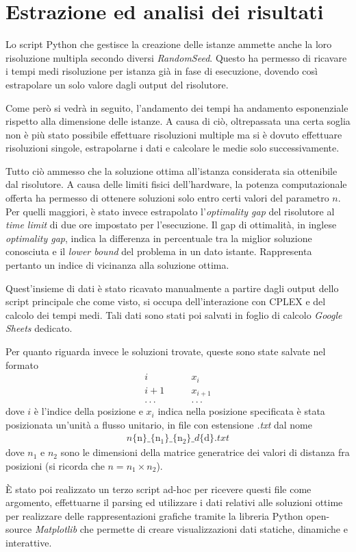 
\section{Estrazione ed analisi dei risultati}
Lo script Python che gestisce la creazione delle istanze ammette anche la loro risoluzione multipla secondo diversi \textit{RandomSeed}. 
Questo ha permesso di ricavare i tempi medi risoluzione per istanza già in fase di esecuzione, dovendo così estrapolare un solo valore 
dagli output del risolutore. 

Come però si vedrà in seguito, l'andamento dei tempi ha andamento esponenziale rispetto alla dimensione delle istanze. A causa di ciò, oltrepassata 
una certa soglia non è più stato possibile effettuare risoluzioni multiple ma si è dovuto effettuare risoluzioni singole, estrapolarne i dati 
e calcolare le medie solo successivamente.

Tutto ciò ammesso che la soluzione ottima all'istanza considerata sia ottenibile dal risolutore. A causa delle limiti fisici dell'hardware, 
la potenza computazionale offerta ha permesso di ottenere soluzioni solo entro certi valori del parametro $n$. Per quelli maggiori, è stato invece estrapolato l'\textit{optimality gap} 
del risolutore al \textit{time limit} di due ore impostato per l'esecuzione. Il gap di ottimalità, in inglese \textit{optimality gap}, indica la differenza 
in percentuale tra la miglior soluzione conosciuta e il \textit{lower bound} del problema in un dato istante. Rappresenta pertanto un indice di vicinanza 
alla soluzione ottima.

Quest'insieme di dati è stato ricavato manualmente a partire dagli output dello script principale che come visto, 
si occupa dell'interazione con CPLEX e del calcolo dei tempi medi. Tali dati sono stati poi salvati in foglio di calcolo \textit{Google Sheets} 
\cite{conner2008google} dedicato.

\noindent
Per quanto riguarda invece le soluzioni trovate, queste sono state salvate nel formato 
\begin{align*}
    i   &\qquad x_i \\
    i+1 &\qquad x_{i+1} \\
    .\, .\, . &\qquad .\, .\, .
\end{align*}
dove $i$ è l'indice della posizione e $x_i$ indica nella posizione specificata è stata posizionata un'unità a flusso unitario, 
in file con estensione \textit{.txt} dal nome
\begin{align*}
    n\{\text{n}\}\_\{\text{n}_1\}\_\{\text{n}_2\}\_d\{\text{d}\}.txt
\end{align*}
dove $n_1$ e $n_2$ sono le dimensioni della matrice generatrice dei valori di distanza fra posizioni (si ricorda che $n=n_1\times n_2$).

È stato poi realizzato un terzo script ad-hoc per ricevere questi file come argomento, effettuarne il parsing ed utilizzare i dati relativi alle 
soluzioni ottime per realizzare delle rappresentazioni grafiche tramite la libreria Python open-source \textit{Matplotlib} \cite{matplotlib} 
che permette di creare visualizzazioni dati statiche, dinamiche e interattive.